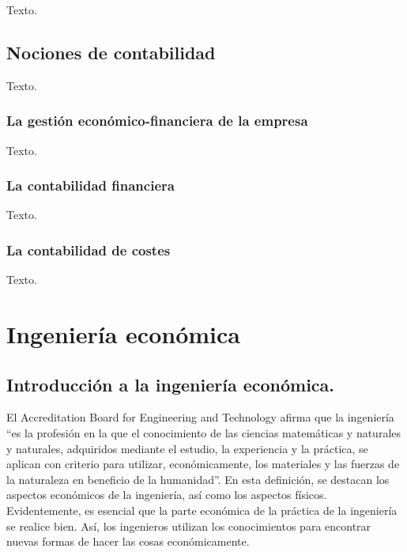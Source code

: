 \documentclass[
]{krantz}
\begin{document}
Texto.

\hypertarget{nociones-de-contabilidad}{%
\chapter{Nociones de contabilidad}\label{nociones-de-contabilidad}}

Texto.

\hypertarget{la-gestiuxf3n-econuxf3mico-financiera-de-la-empresa}{%
\section{La gestión económico-financiera de la empresa}\label{la-gestiuxf3n-econuxf3mico-financiera-de-la-empresa}}

Texto.

\hypertarget{la-contabilidad-financiera}{%
\section{La contabilidad financiera}\label{la-contabilidad-financiera}}

Texto.

\hypertarget{la-contabilidad-de-costes}{%
\section{La contabilidad de costes}\label{la-contabilidad-de-costes}}

Texto.

\hypertarget{part-ingenieruxeda-econuxf3mica}{%
\part{Ingeniería económica}\label{part-ingenieruxeda-econuxf3mica}}

\hypertarget{introducciuxf3n-a-la-ingenieruxeda-econuxf3mica.}{%
\chapter{Introducción a la ingeniería económica.}\label{introducciuxf3n-a-la-ingenieruxeda-econuxf3mica.}}

El Accreditation Board for Engineering and Technology \citep{abet1998} afirma que la ingeniería ``es la profesión en la que el conocimiento de las ciencias matemáticas y naturales y naturales, adquiridos mediante el estudio, la experiencia y la práctica, se aplican con criterio para utilizar, económicamente, los materiales y las fuerzas de la naturaleza en beneficio de la humanidad''. En esta definición, se destacan los aspectos económicos de la ingeniería, así como los aspectos físicos. Evidentemente, es esencial que la parte económica de la práctica de la ingeniería se realice bien. Así, los ingenieros utilizan los conocimientos para encontrar nuevas formas de hacer las cosas económicamente.
\end{document}
